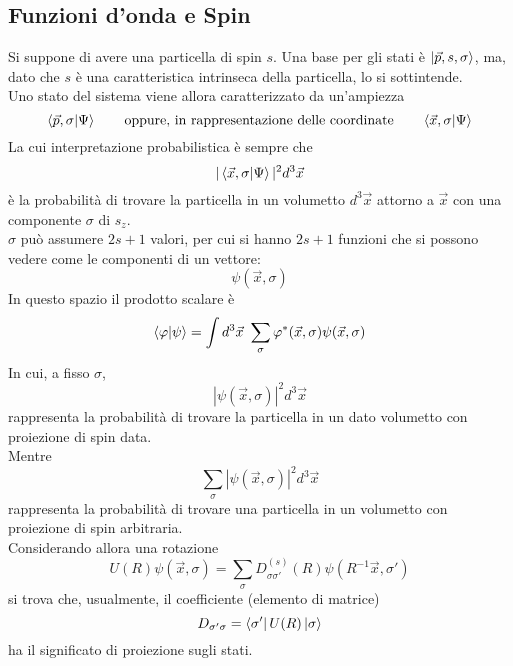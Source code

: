 \documentclass[twoside]{article}
\begin{document}
\subsection{Funzioni d'onda e Spin}
Si suppone di avere una particella di spin $s$. Una base per gli stati è $\ket{\Vec{p},s,\sigma}$, ma, dato che $s$ è una caratteristica intrinseca della particella, lo si sottintende.
\\
Uno stato del sistema viene allora caratterizzato da un'ampiezza
\begin{equation}
    \bra{\Vec{p},\sigma}\ket{\Psi} \ \ \ \ \ \ \text{oppure, in rappresentazione delle coordinate} \ \ \ \ \ \ \bra{\Vec{x},\sigma}\ket{\Psi}
\end{equation}
La cui interpretazione probabilistica è sempre che
\begin{equation}
    |\bra{\Vec{x},\sigma}\ket{\Psi}|^2 d^3\Vec{x}
\end{equation}
è la probabilità di trovare la particella in un volumetto $d^3\Vec{x}$ attorno a $\Vec{x}$ con una componente $\sigma$ di $s_z$.
\\
$\sigma$ può assumere $2s+1$ valori, per cui si hanno $2s+1$ funzioni che si possono vedere come le componenti di un vettore:
\begin{equation}
    \psi(\Vec{x},\sigma)
\end{equation}
In questo spazio il prodotto scalare è
\begin{equation}
    \bra{\varphi}\ket{\psi}=\int d^3\Vec{x} \ \sum_{\sigma} \varphi ^* (\Vec{x},\sigma)\psi(\Vec{x},\sigma)
\end{equation}
In cui, a fisso $\sigma$, 
\begin{equation}
    |\psi(\Vec{x},\sigma)|^2 d^3\Vec{x}
\end{equation}
rappresenta la probabilità di trovare la particella in un dato volumetto con proiezione di spin data.
\\
Mentre 
\begin{equation}
\sum_{\sigma}|\psi(\Vec{x},\sigma)|^2 d^3\Vec{x}    
\end{equation}
rappresenta la probabilità di trovare una particella in un volumetto con proiezione di spin arbitraria.
\\
Considerando allora una rotazione
\begin{equation}
    U(R)\psi(\Vec{x},\sigma)=\sum_{\sigma}D_{\sigma \sigma'}^{(s)}(R) \psi(R^{-1}\Vec{x},\sigma')
\end{equation}
si trova che, usualmente, il coefficiente (elemento di matrice)
\begin{equation}
    D_{\sigma' \sigma}=\bra{\sigma'}U(R)\ket{\sigma}
\end{equation}
ha il significato di proiezione sugli stati.
\end{document}
